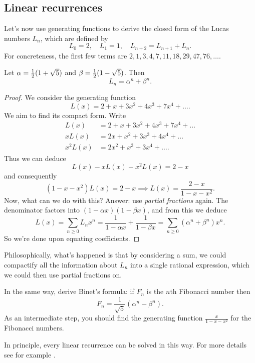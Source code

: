 \documentclass[11pt]{scrartcl}
\begin{document}
\subsection{Linear recurrences}
Let's now use generating functions to derive the closed form of
the Lucas numbers $L_n$, which are defined by
\[ L_0 = 2, \quad L_1 = 1, \quad L_{n+2} = L_{n+1} + L_n.\] 
For concreteness, the first few terms are
$2, 1, 3, 4, 7, 11, 18, 29, 47, 76, \dots$.
\begin{theorem}
	Let $\alpha = \frac{1}{2}(1+\sqrt5)$ and $\beta=\frac{1}{2}(1-\sqrt5)$.
	Then
	\[ L_n = \alpha^n + \beta^n. \]
\end{theorem}
\begin{proof}
	We consider the generating function
	\[ L(x) = 2 + x + 3x^2 + 4x^3 + 7x^4 + \dots. \]
	We aim to find its compact form.
	Write
	\begin{align*}
		L(x) &= 2 + x + 3x^2 + 4x^3 + 7x^4 + \dots \\
		xL(x) &= 2x + x^2 + 3x^3 + 4x^4 + \dots \\
		x^2L(x) &= 2x^2 + x^3 + 3x^4 + \dots.
	\end{align*}
	Thus we can deduce
	\[ L(x) - xL(x) - x^2L(x) = 2-x \]
	and consequently
	\[ (1-x-x^2)L(x) = 2-x
		\implies L(x) = \frac{2-x}{1-x-x^2}. \]
	Now, what can we do with this?
	Answer: use \emph{partial fractions} again.
	The denominator factors into $(1-\alpha x)(1-\beta x)$,
	and from this we deduce
	\[
		L(x) = \sum_{n \ge 0} L_n x^n
		= \frac{1}{1-\alpha x} + \frac{1}{1 - \beta x}
		= \sum_{n \ge 0} \left( \alpha^n + \beta^n \right)x^n.
	\]
	So we're done upon equating coefficients.
\end{proof}
Philosophically, what's happened is that by considering a sum,
we could compactify all the information about $L_n$ into a single
rational expression, which we could then use partial fractions on.

\begin{exercise}
	In the same way, derive Binet's formula:
	if $F_n$ is the $n$th Fibonacci number then
	\[ F_n = \frac{1}{\sqrt5}(\alpha^n-\beta^n). \]
	As an intermediate step,
	you should find the generating function $\frac{x}{1-x-x^2}$
	for the Fibonacci numbers.
\end{exercise}

In principle, every linear recurrence can be solved in this way.
For more details see for example \cite{ref:linear}.
\end{document}
